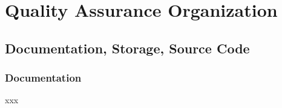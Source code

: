 \section{Quality Assurance Organization}

\subsection{Documentation, Storage, Source Code} \label{sec:documentation_storage_source_code}

\begin{comment}
    Documentation
        Andre skal kanskje bruke eller gjenbruke produktet vårt, så viktig med dokumentasjon av både sluttproduktet, i tillegg til hele prosessen.

        Kode-produkter(?)
            Deployment
            APIdoc

        Arbeidsprosessen
            Så mye som mulig skal ligge under issues under GitHub Project, slik at vi dokumenterer hva vi har gjort. Timeføring blir gjort i Traggo som er tag-basert, slik at vi kan se hvor lenge vi har jobbet med feks admin, thesis, metting osv.
        
        Møter og enigheter
            Møtenotater/referat skal bli tatt av alle møter
            Alle viktige valg som blir gjort etter diskusjoner blir notert

    Source code
        Dokumentasjon av koden kommer til å bli brukt av gruppemedlemene, men kan også bli brukt av noen som vil videreutvikle produktet.
        Følge industri-standard dokumentasjon og kodestil for hvert kodespråk, med hyppig bruk av en linter. 
        Prøve å skrive self-documenting code ved å ha descriptive funksjonsnavn og variabler, slik at man kan holde kodekommentarene korte og konsise
        
\end{comment}
\subsubsection{Documentation}

xxx

